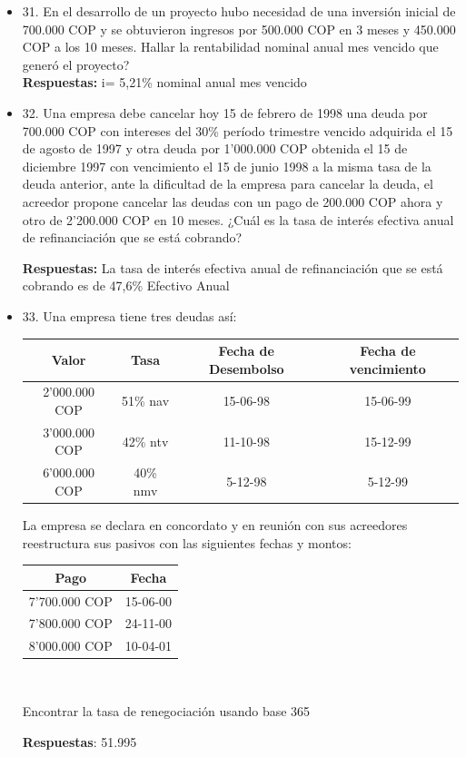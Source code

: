 \begin{itemize}
 \textbf{Respuestas:} Se deberá pagar ese dinero en 3 meses y 21 días
       \medskip

 \item 31. En el desarrollo de un proyecto hubo necesidad de una inversión inicial de 700.000 COP y se obtuvieron ingresos por 500.000 COP en 3 meses y 450.000 COP a los 10 meses. Hallar la rentabilidad nominal anual mes vencido que generó el proyecto?\\
  \textbf{Respuestas:} i= 5,21\% nominal anual mes vencido  
       \medskip

 \item 32. Una empresa debe cancelar hoy 15 de febrero de 1998 una deuda por 700.000 COP con intereses del 30\% período trimestre vencido adquirida el 15 de agosto de 1997 y otra deuda por 1’000.000 COP obtenida el 15 de diciembre 1997 con vencimiento el 15 de junio 1998 a la misma tasa de la deuda anterior, ante la dificultad de la empresa para cancelar la deuda, el acreedor propone cancelar las deudas con un pago de 200.000 COP ahora y otro de 2’200.000 COP en 10 meses. ¿Cuál es la tasa de interés efectiva anual de refinanciación que se está cobrando?
 
 \textbf{Respuestas:} La tasa de interés efectiva anual de refinanciación que se está cobrando es de 47,6\% Efectivo Anual
       \medskip

 \item 33. Una empresa tiene tres deudas así:
 \begin{center}
    \begin{tabular}{| c | c | c | c |}\hline
    \textbf{Valor} & \textbf{Tasa} & \textbf{Fecha de Desembolso} & \textbf{Fecha de vencimiento} \\ \hline
    2’000.000 COP & 51\% nav  & 15-06-98 & 15-06-99 \\ \hline
    3’000.000 COP & 42\% ntv &11-10-98 &15-12-99\\ \hline
    6’000.000 COP & 40\% nmv &5-12-98 &5-12-99\\ \hline
    \end{tabular}
 \end{center}
 
    \textbf{}La empresa se declara en concordato y en reunión con sus acreedores reestructura sus pasivos con las siguientes fechas y montos:\\
 \begin{center}
     \begin{tabular}{| c | c |}
    \hline
    \textbf{Pago} & \textbf{Fecha}  \\ \hline
    7’700.000 COP &15-06-00  \\ \hline
    7’800.000 COP & 24-11-00 \\ \hline
    8’000.000 COP & 10-04-01 \\ \hline
    \end{tabular}\\
 \end{center}
    \textbf{}Encontrar la tasa de renegociación usando base 365
    
    \textbf{Respuestas}: 51.995%

\end{itemize}



